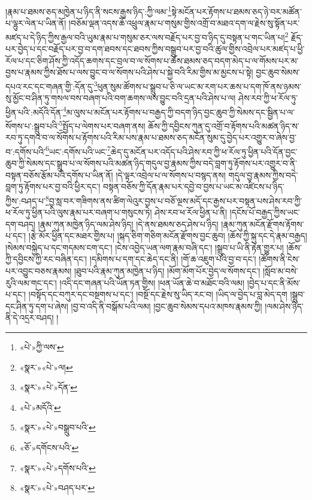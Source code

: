 །རྣམ་པ་ཐམས་ཅད་མཁྱེན་པ་ཉིད་ནི་སངས་རྒྱས་ཉིད་:ཀྱི་ལམ་\footnote{«པེ་»ཀྱི་ལས་}སྟེ་མངོན་པར་རྟོགས་པ་ཐམས་ཅད་ཉེ་བར་མཚོན་པ་ལྷུར་ལེན་པ་ཡིན་ནོ། །བཅོམ་ལྡན་འདས་ཆོ་འཕྲུལ་རྣམ་པ་གསུམ་གྱིས་འགྲོ་བ་མཐའ་དག་ལ་རྗེས་སུ་སྟོན་པར་མཛད་པ་དེ་ཉིད་ཀྱིས་རྒྱལ་བའི་ཡུམ་རྣམ་པ་གསུམ་ཅར་ལས་བརྗོད་པར་བྱ་བ་ཉིད་དུ་བསྟན་པ་གང་ཡིན་པ།\footnote{«སྣར་»«པེ་»ལ།} རྗོད་པར་བྱེད་པ་དང་བརྗོད་པར་བྱ་བ་དག་ཐབས་དང་ཐབས་ཀྱིས་བསྒྲུབ་པར་བྱ་བའི་ཚུལ་གྱིས་འབྲེལ་པར་མཛད་པ་ཕྱི་རོལ་པ་དང་ཅིག་ཤོས་ཀྱི་འདོད་ཆགས་དང་བྲལ་བ་ལ་སོགས་པ་ཆོས་ཐམས་ཅད་བདག་མེད་པ་ལ་གོམས་པར་མ་བྱས་པ་རྣམས་ཀྱིས་ཐོས་པ་ལས་བྱུང་བ་ལ་སོགས་པའི་ཤེས་པ་སྐྱེ་བའི་རིམ་གྱིས་མ་མྱངས་པ་སྟེ། བྱང་ཆུབ་སེམས་དཔའ་རང་དང་གཞན་གྱི་:དོན་དུ་\footnote{«སྣར་»«པེ་»དོན་}ཕུན་སུམ་ཚོགས་པ་སྒྲུབ་པ་ཅི་ལ་ཡང་མ་རག་པར་ཆས་པ་དག་ཁོ་ནས་ཉམས་སུ་མྱོང་བ་ཤིན་ཏུ་གསལ་བས་བཞག་པའི་བག་ཆགས་ལས་བྱུང་བའི་དྲན་པའི་ཤེས་པ་ལ། ཤེས་རབ་ཀྱི་ཕ་རོལ་ཏུ་ཕྱིན་པའི་:མདོའི་དོན་\footnote{«པེ་»མདོའི་}མ་ལུས་པ་མངོན་པར་རྟོགས་པ་བརྒྱད་ཀྱི་བདག་ཉིད་བྱང་ཆུབ་ཀྱི་སེམས་དང་སྦྱིན་པ་ལ་སོགས་པ་:སྒྲུབ་པའི་\footnote{«སྣར་»«པེ་»བསྒྲུབ་པའི་}སྤྱོད་པ་ལེགས་པར་བཞག་ནས། ཆོས་ཀྱི་དབྱིངས་ཀུན་དུ་འགྲོ་བ་རྟོགས་པའི་མཚན་ཉིད་ས་རབ་ཏུ་དགའ་བ་ལ་སོགས་པ་རྟོགས་པའི་རིམ་པས་རྣམ་པ་ཐམས་ཅད་མངོན་སུམ་དུ་བྱེད་པར་འགྱུར་བ་ཞེས་བྱ་བ་:དགོས་པའི་\footnote{«ཅོ་»དགོངས་པའི་}ཡང་:དགོས་པའི་ཡང་\footnote{«སྣར་»«པེ་»དགོས་པའི་}ཆེད་དུ་མངོན་པར་འདོད་པའི་ཤེས་རབ་ཀྱི་ཕ་རོལ་ཏུ་ཕྱིན་པའི་དོན་བྱང་ཆུབ་ཀྱི་སེམས་དང་སྒྲུབ་པ་ལ་སོགས་པའི་མཚན་ཉིད་གདུལ་བྱ་རྣམས་ཀྱིས་བདེ་བླག་ཏུ་རྟོགས་པར་འགྱུར་བ་ནི་བསྟན་བཅོས་རྩོམ་པའི་དགོས་པ་ཡིན་ནོ། །དེ་ལྟར་འབྲེལ་པ་ལ་སོགས་པ་བསྙད་ནས། གདུལ་བྱ་རྣམས་ཀྱིས་བདེ་བླག་ཏུ་རྟོགས་པར་བྱ་བའི་ཕྱིར་དང་། བསྟན་བཅོས་ཀྱི་དོན་རྣམ་པར་དབྱེ་བ་བྱས་པ་ཡང་མ་འཛིངས་པ་ཉིད་ཀྱིས་:བཤད་པ་\footnote{«སྣར་»«པེ་»བཤད་པར་}བྱ་སླ་བར་གཟིགས་ནས་ཚིག་ལེའུར་བྱས་པ་བཅོ་ལྔས་མདོ་དང་རྒྱས་པར་བསྟན་པས་ཤེས་རབ་ཀྱི་ཕ་རོལ་ཏུ་ཕྱིན་པའི་ལུས་རྣམ་པར་བཞག་པ་གསུངས་ཏེ། ཤེས་རབ་ཕ་རོལ་ཕྱིན་པ་ནི། །དངོས་པོ་བརྒྱད་ཀྱིས་ཡང་དག་བཤད། །རྣམ་ཀུན་མཁྱེན་ཉིད་ལམ་ཤེས་ཉིད། །དེ་ནས་ཐམས་ཅད་ཤེས་པ་ཉིད། །རྣམ་ཀུན་མངོན་རྫོགས་རྟོགས་པ་དང་། །རྩེ་མོར་ཕྱིན་དང་མཐར་གྱིས་པ། །སྐད་ཅིག་གཅིག་མངོན་རྫོགས་བྱང་ཆུབ། །ཆོས་ཀྱི་སྐུ་དང་དེ་རྣམ་བརྒྱད། །སེམས་བསྐྱེད་པ་དང་གདམས་ངག་དང་། །ངེས་འབྱེད་ཡན་ལག་རྣམ་བཞི་དང་། །སྒྲུབ་པ་ཡི་ནི་རྟེན་གྱུར་པ། །ཆོས་ཀྱི་དབྱིངས་ཀྱི་རང་བཞིན་དང་། །དམིགས་པ་དག་དང་ཆེད་དང་ནི། །གོ་ཆ་འཇུག་པའི་བྱ་བ་དང་། །ཚོགས་ནི་ངེས་པར་འབྱུང་བཅས་རྣམས། །ཐུབ་པའི་རྣམ་ཀུན་མཁྱེན་པ་ཉིད། །མོག་མོག་པོར་བྱེད་ལ་སོགས་དང་། །སློབ་མ་བསེ་རུའི་ལམ་གང་དང་། །འདི་དང་གཞན་པའི་ཡོན་ཏན་གྱིས། །ཕན་ཡོན་ཆེ་བ་མཐོང་བའི་ལམ། །བྱེད་པ་དང་ནི་མོས་པ་དང་། །བསྟོད་དང་བཀུར་དང་བསྔགས་པ་དང་། །བསྔོ་དང་རྗེས་སུ་ཡིད་རང་བ། །ཡིད་ལ་བྱེད་པ་བླ་མེད་དག །སྒྲུབ་དང་ཤིན་ཏུ་དག་པ་ཞེས། །བྱ་བ་འདི་ནི་བསྒོམ་པའི་ལམ། །བྱང་ཆུབ་སེམས་དཔའ་མཁས་རྣམས་ཀྱི། །ལམ་ཤེས་ཉིད་ནི་དེ་འདྲར་བཤད། །
